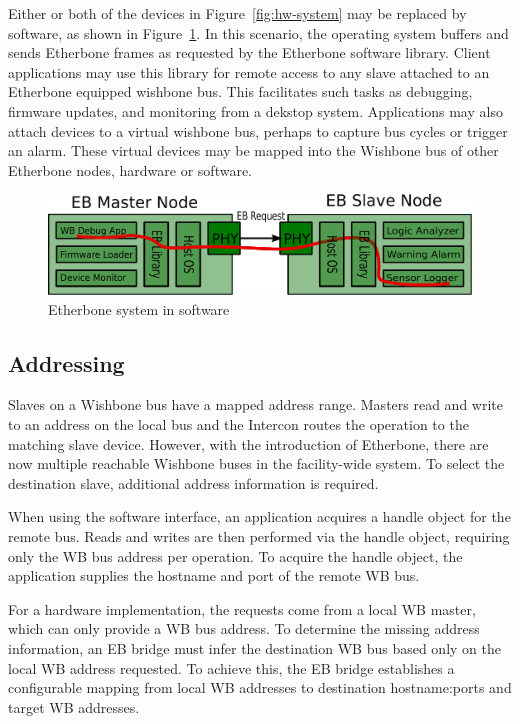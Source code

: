\documentclass{article}
\begin{document}
Either or both of the devices in Figure~\ref{fig:hw-system} may be replaced by software,
as shown in Figure~\ref{fig:sw-system}.
In this scenario,
the operating system buffers and sends Etherbone frames as requested by the
Etherbone software library.
Client applications may use this library for remote access to
any slave attached to an Etherbone equipped wishbone bus.
This facilitates such tasks as debugging, firmware updates, and monitoring from a
dekstop system.
Applications may also attach devices to a virtual wishbone bus,
perhaps to capture bus cycles or trigger an alarm.
These virtual devices may be mapped into the Wishbone bus of other Etherbone nodes,
hardware or software.

\begin{figure}[t]
\centering%
\includegraphics[width=\columnwidth]{software}
\caption{Etherbone system in software}
\label{fig:sw-system}
\end{figure}

\subsection{Addressing}

Slaves on a Wishbone bus have a mapped address range.
Masters read and write to an address on the local bus
and the Intercon routes the operation to the matching slave device.
However, with the introduction of Etherbone, 
there are now multiple reachable Wishbone buses in the facility-wide system.
To select the destination slave, additional address information is required.

When using the software interface,
an application acquires a handle object for the remote bus.
Reads and writes are then performed via the handle object,
requiring only the WB bus address per operation.
To acquire the handle object, 
the application supplies the hostname and port of the remote WB bus.

For a hardware implementation,
the requests come from a local WB master,
which can only provide a WB bus address.
To determine the missing address information,
an EB bridge must infer the destination WB bus 
based only on the local WB address requested.
To achieve this,
the EB bridge establishes a configurable mapping from local WB addresses to
destination hostname:ports and target WB addresses.
\end{document}
